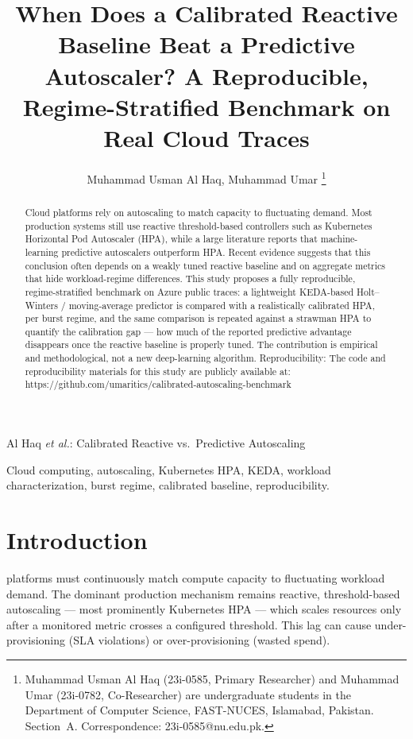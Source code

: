 \documentclass[journal]{IEEEtran}
\begin{document}
\title{When Does a Calibrated Reactive Baseline Beat a Predictive Autoscaler? A Reproducible, Regime-Stratified Benchmark on Real Cloud Traces}

\author{Muhammad Usman Al Haq, Muhammad Umar%
\thanks{Muhammad Usman Al Haq (23i-0585, Primary Researcher) and Muhammad Umar (23i-0782, Co-Researcher) are undergraduate students in the Department of Computer Science, FAST-NUCES, Islamabad, Pakistan. Section~A. Correspondence: 23i-0585@nu.edu.pk.}%
}

%
{Al Haq \MakeLowercase{\textit{et al.}}: Calibrated Reactive vs.\ Predictive Autoscaling}

\maketitle

\begin{abstract}
Cloud platforms rely on autoscaling to match capacity to fluctuating demand. Most production systems still use reactive threshold-based controllers such as Kubernetes Horizontal Pod Autoscaler (HPA), while a large literature reports that machine-learning predictive autoscalers outperform HPA. Recent evidence suggests that this conclusion often depends on a weakly tuned reactive baseline and on aggregate metrics that hide workload-regime differences. This study proposes a fully reproducible, regime-stratified benchmark on Azure public traces: a lightweight KEDA-based Holt--Winters / moving-average predictor is compared with a realistically calibrated HPA, per burst regime, and the same comparison is repeated against a strawman HPA to quantify the calibration gap --- how much of the reported predictive advantage disappears once the reactive baseline is properly tuned. The contribution is empirical and methodological, not a new deep-learning algorithm. Reproducibility: The code and reproducibility materials for this study are publicly available at: https://github.com/umaritics/calibrated-autoscaling-benchmark
\end{abstract}

\begin{IEEEkeywords}
Cloud computing, autoscaling, Kubernetes HPA, KEDA, workload characterization, burst regime, calibrated baseline, reproducibility.
\end{IEEEkeywords}

\IEEEpeerreviewmaketitle

\section{Introduction}
 platforms must continuously match compute capacity to fluctuating workload demand. The dominant production mechanism remains reactive, threshold-based autoscaling --- most prominently Kubernetes HPA --- which scales resources only after a monitored metric crosses a configured threshold. This lag can cause under-provisioning (SLA violations) or over-provisioning (wasted spend).
\end{document}

